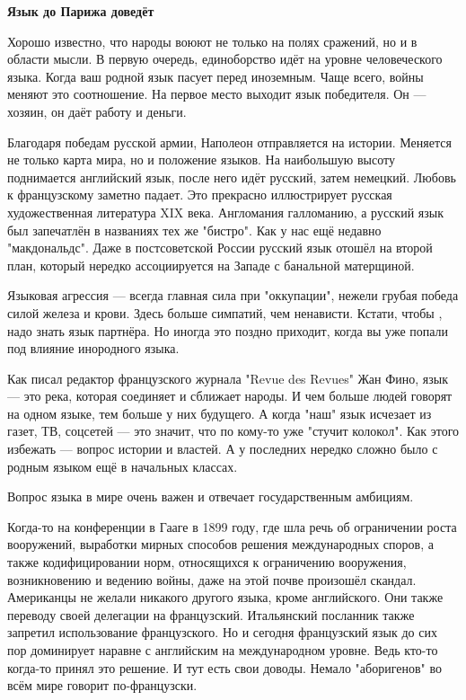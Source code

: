 \textbf{Язык до Парижа доведёт}

Хорошо известно, что народы воюют не только на полях сражений, но и в области мысли. В первую очередь, единоборство идёт на уровне человеческого языка. Когда ваш родной язык пасует перед иноземным. Чаще всего, войны меняют это соотношение. На первое место выходит язык победителя. Он — хозяин, он даёт работу и деньги.

Благодаря победам русской армии, Наполеон отправляется на  истории. Меняется не только карта мира, но и положение языков. На наибольшую высоту поднимается английский язык, после него идёт русский, затем немецкий. Любовь к французскому заметно падает. Это прекрасно иллюстрирует русская художественная литература XIX века. Англомания  галломанию, а русский язык был запечатлён в названиях тех же "бистро". Как у нас ещё недавно "макдональдс". Даже в постсоветской России русский язык отошёл на второй план, который нередко ассоциируется на Западе с банальной матерщиной.

Языковая агрессия — всегда главная сила при "оккупации", нежели грубая победа силой железа и крови. Здесь больше симпатий, чем ненависти. Кстати, чтобы , надо знать язык партнёра. Но иногда это поздно приходит, когда вы уже попали под влияние инородного языка.

Как писал редактор французского журнала "Revue des Revues" Жан Фино, язык — это река, которая соединяет и сближает народы. И чем больше людей говорят на одном языке, тем больше у них будущего. А когда "наш" язык исчезает из газет, ТВ, соцсетей — это значит, что по кому-то уже "стучит колокол". Как этого избежать — вопрос истории и властей. А у последних нередко сложно было с родным языком ещё в начальных классах.

Вопрос  языка в мире очень важен и отвечает государственным амбициям.

Когда-то на конференции в Гааге в 1899 году, где шла речь об ограничении роста вооружений, выработки мирных способов решения международных споров, а также кодифицировании норм, относящихся к ограничению вооружения, возникновению и ведению войны, даже на этой почве произошёл скандал. Американцы не желали никакого другого языка, кроме английского. Они также  переводу своей делегации на французский. Итальянский посланник также запретил использование французского. Но и сегодня французский язык до сих пор доминирует наравне с английским на международном уровне. Ведь кто-то когда-то принял это решение. И тут есть свои доводы. Немало "аборигенов" во всём мире говорит по-французски.

